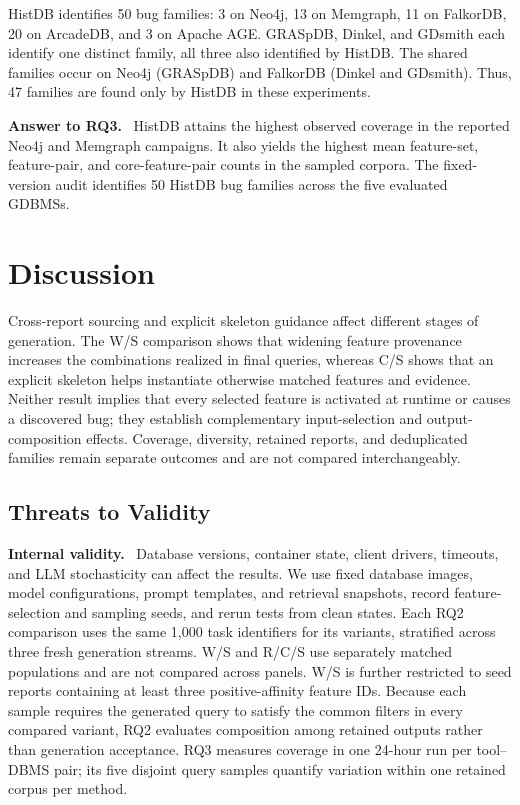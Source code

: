 \documentclass[acmsmall,screen,anonymous]{acmart}
\newcommand{\cnpara}[1]{\par\noindent\textbf{#1.}\ }
\begin{document}
\begin{figure}[htbp]
\centering
\begin{minipage}{0.78\linewidth}

\end{minipage}
\end{figure}



HistDB identifies 50 bug families: 3 on Neo4j, 13 on Memgraph, 11 on FalkorDB, 20 on ArcadeDB, and 3 on Apache AGE. GRASpDB, Dinkel, and GDsmith each identify one distinct family, all three also identified by HistDB. The shared families occur on Neo4j (GRASpDB) and FalkorDB (Dinkel and GDsmith). Thus, 47 families are found only by HistDB in these experiments.



\cnpara{Answer to RQ3}
HistDB attains the highest observed coverage in the reported Neo4j and Memgraph campaigns. It also yields the highest mean feature-set, feature-pair, and core-feature-pair counts in the sampled corpora. The fixed-version audit identifies 50 HistDB bug families across the five evaluated GDBMSs.

\section{Discussion}

Cross-report sourcing and explicit skeleton guidance affect different stages of generation. The W/S comparison shows that widening feature provenance increases the combinations realized in final queries, whereas C/S shows that an explicit skeleton helps instantiate otherwise matched features and evidence. Neither result implies that every selected feature is activated at runtime or causes a discovered bug; they establish complementary input-selection and output-composition effects. Coverage, diversity, retained reports, and deduplicated families remain separate outcomes and are not compared interchangeably.

\subsection{Threats to Validity}

\cnpara{Internal validity}
Database versions, container state, client drivers, timeouts, and LLM stochasticity can affect the results. We use fixed database images, model configurations, prompt templates, and retrieval snapshots, record feature-selection and sampling seeds, and rerun tests from clean states. Each RQ2 comparison uses the same 1,000 task identifiers for its variants, stratified across three fresh generation streams. W/S and R/C/S use separately matched populations and are not compared across panels. W/S is further restricted to seed reports containing at least three positive-affinity feature IDs. Because each sample requires the generated query to satisfy the common filters in every compared variant, RQ2 evaluates composition among retained outputs rather than generation acceptance. RQ3 measures coverage in one 24-hour run per tool--DBMS pair; its five disjoint query samples quantify variation within one retained corpus per method.
\end{document}

